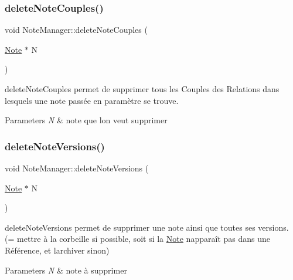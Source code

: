 \subsubsection{\texorpdfstring{delete\+Note\+Couples()}{deleteNoteCouples()}}
{\footnotesize\ttfamily void Note\+Manager\+::delete\+Note\+Couples (\begin{DoxyParamCaption}\item[{\hyperlink{classNote}{Note} $\ast$}]{N }\end{DoxyParamCaption})}



delete\+Note\+Couples permet de supprimer tous les Couples des Relations dans lesquels une note passée en paramètre se trouve. 


\begin{DoxyParams}{Parameters}
{\em N} & note que l\textquotesingle{}on veut supprimer \\
\hline
\end{DoxyParams}
\mbox{\label{classNoteManager_af6d2605fc8319600c4a283ba9879dbd6}} 
\subsubsection{\texorpdfstring{delete\+Note\+Versions()}{deleteNoteVersions()}}
{\footnotesize\ttfamily void Note\+Manager\+::delete\+Note\+Versions (\begin{DoxyParamCaption}\item[{\hyperlink{classNote}{Note} $\ast$}]{N }\end{DoxyParamCaption})}



delete\+Note\+Versions permet de supprimer une note ainsi que toutes ses versions. (= mettre à la corbeille si possible, soit si la \hyperlink{classNote}{Note} n\textquotesingle{}apparaît pas dans une Référence, et l\textquotesingle{}archiver sinon) 


\begin{DoxyParams}{Parameters}
{\em N} & note à supprimer \\
\hline
\end{DoxyParams}
\mbox{\label{classNoteManager_adc36b51fd28662048fb1f1a8b73cb61e}} 

